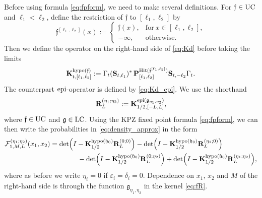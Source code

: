 \documentclass[oneside,final,11pt]{amsart}
\theoremstyle{definition}
\newcommand\hit{\uptext{Hit}}
\newcommand{\fh}{\mathfrak{h}}
\newcommand{\fg}{\mathfrak{g}}
\newcommand{\ff}{\mathfrak{f}}
\newcommand{\dens}{\CF}
\newcommand{\1}[1]{\mathbf{1}_{#1}}
\newcommand{\eps}{\varepsilon}
\newcommand{\uptext}[1]{\text{\upshape{#1}}}
\DeclareMathOperator{\epi}{\uptext{epi}}
\DeclareMathOperator{\hypo}{\uptext{hypo}}
\DeclareMathOperator{\UC}{\uptext{UC}}
\DeclareMathOperator{\LC}{\uptext{LC}}
\newcommand{\fT}{\mathbf{S}}
\newcommand{\fx}{x}
\newcommand{\fM}{M}
\newcommand{\fP}{\mathbf{P}}
\newcommand{\fK}{\mathbf{K}}
\newcommand{\fR}{\mathbf{R}}
\newcommand{\CF}{\mathcal{F}}
\numberwithin{equation}{section}
\begin{document}
Before using formula \eqref{eq:fpform}, we need to make several definitions. For $\ff \in \UC$ and $\ell_1 < \ell_2$, define the restriction of $\ff$ to $[\ell_1,\ell_2]$ by
\begin{equation}
\ff^{[\ell_1,\ell_2]}(x) :=
\begin{cases}
\ff(x), &\text{for}~x \in [\ell_1,\ell_2],\\
-\infty, &\text{otherwise}.
\end{cases}
\end{equation}
Then we define the operator on the right-hand side of \eqref{eq:Kd} before taking the limits
\begin{equation}\label{eq:Kd_prelimit}
\fK^{\hypo(\ff)}_{t, [\ell_1,\ell_2]} := \Gamma_t (\fT_{t,\ell_1})^*\, \fP_{[\ell_1,\ell_2]}^{\hit(\ff^{[\ell_1,\ell_2]})}\fT_{t,-\ell_2} \Gamma_t.
\end{equation}
The counterpart $\epi$-operator is defined by \eqref{eq:Kd_epi}. We use the shorthand
 \begin{equation}\label{eq:fR}
 \fR_L^{(\eta_1; \eta_2)} := \fK^{\epi(\fg_{\eta_1, \eta_2})}_{1/2, [-L,L]},%
 \end{equation}
 where $\ff \in \UC$ and $\fg \in \LC$. %
 Using the KPZ fixed point formula \eqref{eq:fpform}, we can then write the probabilities in \eqref{eq:density_approx} in the form
\begin{align}
\dens_{1, \fM, L}^{(\eta_1; \eta_2)}(\fx_1, \fx_2) &= \det \Bigl(I-\fK^{\hypo(\fh_0)}_{1/2} \fR_L^{(0; 0)}\Bigr) - \det\Bigl(I-\fK^{\hypo(\fh_0)}_{1/2} \fR_L^{(\eta_1; 0)}\Bigr)\\
&\qquad\qquad - \det \Bigl(I-\fK^{\hypo(\fh_0)}_{1/2} \fR_L^{(0; \eta_2)}\Bigr) + \det \Bigl(I-\fK^{\hypo(\fh_0)}_{1/2} \fR_L^{(\eta_1; \eta_2)}\Bigr),\label{eq:P_det}
\end{align}
where as before we write $\eta_i = 0$ if $\eps_i = \delta_i = 0$. Dependence on $\fx_1$, $\fx_2$ and $\fM$ of the right-hand side is through the function $\fg_{\eta_1, \eta_2}$ in the kernel \eqref{eq:fR}. %
\end{document}
